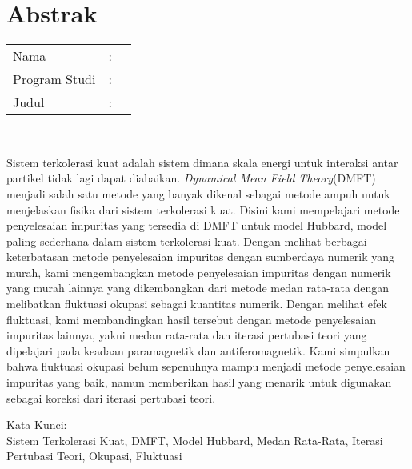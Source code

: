%
%
%

\chapter*{Abstrak}

\vspace*{0.2cm}

\noindent \begin{tabular}{l l p{10cm}}
	Nama&: & \penulis \\
	Program Studi&: & \program \\
	Judul&: & \judul \\
\end{tabular} \\ 

\vspace*{0.5cm}

\noindent Sistem terkolerasi kuat adalah sistem dimana skala energi untuk interaksi antar partikel tidak lagi dapat diabaikan. \textit{Dynamical Mean Field Theory}(DMFT) menjadi salah satu metode yang banyak dikenal sebagai metode ampuh untuk menjelaskan fisika dari sistem terkolerasi kuat. Disini kami mempelajari metode penyelesaian impuritas yang tersedia di DMFT untuk model Hubbard, model paling sederhana dalam sistem terkolerasi kuat. Dengan melihat berbagai keterbatasan metode penyelesaian impuritas dengan sumberdaya numerik yang murah, kami mengembangkan metode penyelesaian impuritas dengan numerik yang murah lainnya yang dikembangkan dari metode medan rata-rata dengan melibatkan fluktuasi okupasi sebagai kuantitas numerik. Dengan melihat efek fluktuasi, kami membandingkan hasil tersebut dengan metode penyelesaian impuritas lainnya, yakni medan rata-rata dan iterasi pertubasi teori yang dipelajari pada keadaan paramagnetik dan antiferomagnetik. Kami simpulkan bahwa fluktuasi okupasi belum sepenuhnya mampu menjadi metode penyelesaian impuritas yang baik, namun memberikan hasil yang menarik untuk digunakan sebagai koreksi dari iterasi pertubasi teori.\\

\vspace*{0.2cm}

\noindent Kata Kunci: \\ 
\noindent Sistem Terkolerasi Kuat, DMFT, Model Hubbard, Medan Rata-Rata, Iterasi Pertubasi Teori, Okupasi, Fluktuasi \\

\newpage